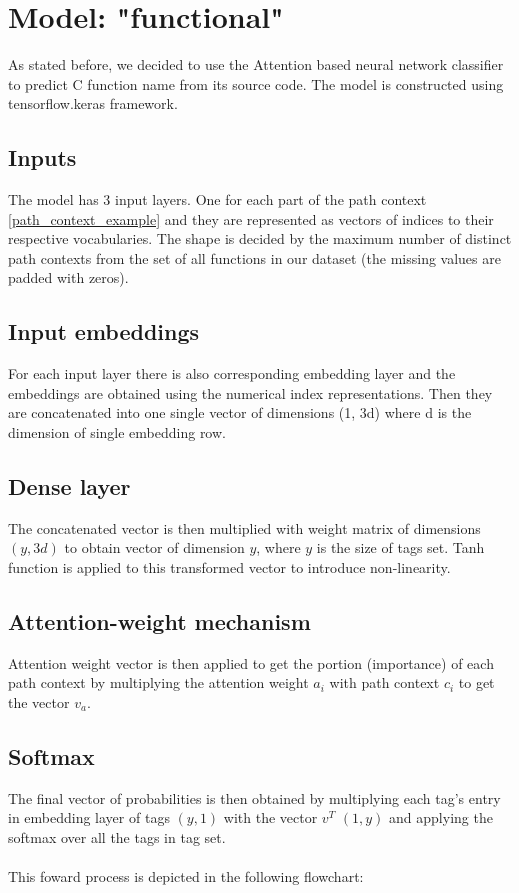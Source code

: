 \documentclass[10pt,english,a4paper]{report}
\begin{document}
\section*{Model: "functional"}
As stated before, we decided to use the Attention based neural network classifier to predict C function name from
its source code. The model is constructed using tensorflow.keras framework.

\subsection{Inputs}
The model has 3 input layers. One for each part of the path context \ref{path_context_example} and they are represented as
vectors of indices to their respective vocabularies. The shape is decided by the maximum
number of distinct path contexts from the set of all functions in our dataset (the missing values are
padded with zeros).

\subsection{Input embeddings}
For each input layer there is also corresponding embedding layer and the embeddings are obtained
using the numerical index representations. Then they are concatenated into one single vector
of dimensions (1, 3d) where d is the dimension of single embedding row.

\subsection{Dense layer}
The concatenated vector is then multiplied with weight matrix of dimensions $(y, 3d)$ to obtain
vector of dimension $y$, where $y$ is the size of tags set. Tanh function is applied to this
transformed vector to introduce non-linearity.

\subsection{Attention-weight mechanism}
Attention weight vector is then applied to get the portion (importance) of each path context
by multiplying the attention weight $a_i$ with path context $c_i$ to get the vector $v_a$.  

\subsection{Softmax}
The final vector of probabilities is then obtained by multiplying each tag's entry in
embedding layer of tags $(y, 1)$ with the vector $v^T$ $(1,y)$ and applying the softmax
over all the tags in tag set. \\ \\
This foward process is depicted in the following flowchart:
\end{document}
